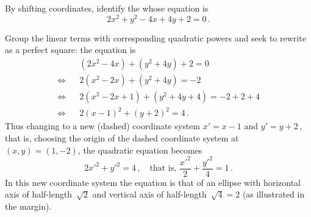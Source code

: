 \begin{example} \label{eg:}
By shifting coordinates, identify the  whose equation is
\begin{equation*}
2x^2+y^2-4x+4y+2=0\,.
\end{equation*}
\begin{solution} 
Group the linear terms with corresponding quadratic powers and seek to rewrite as a perfect square: the equation is
\begin{eqnarray*}&&
(2x^2-4x)+(y^2+4y)+2=0
\\\iff&&
2(x^2-2x)+(y^2+4y)=-2
\\\iff&&
2(x^2-2x+1)+(y^2+4y+4)=-2+2+4
\\\iff&&
2(x-1)^2+(y+2)^2=4\,.
\end{eqnarray*}
Thus changing to a new (dashed) coordinate system \(x'=x-1\) and \(y'=y+2\)\,, that is, choosing the origin of the dashed coordinate system at \((x,y)=(1,-2)\), the quadratic equation becomes
%
\begin{equation*}
2{x'}^2+{y'}^2=4\,, \quad\text{that is, }
\frac{{x'}^2}{2}+\frac{{y'}^2}{4}=1\,.
\end{equation*}
In this new coordinate system the equation is that of an ellipse with horizontal axis of half-length~\(\sqrt2\) and vertical axis of half-length~\(\sqrt4=2\) (as illustrated in the margin).
\end{solution}
\end{example}


